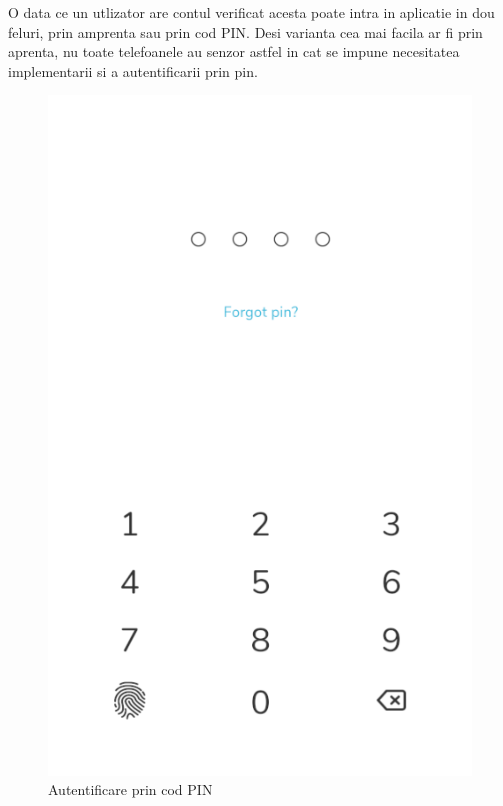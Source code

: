 \documentclass[12pt]{article}
\begin{document}
O data ce un utlizator are contul verificat acesta poate intra in aplicatie
in dou feluri, prin amprenta sau prin cod PIN. Desi varianta cea mai facila ar fi prin
aprenta, nu toate telefoanele au senzor astfel in cat se impune necesitatea implementarii
si a autentificarii prin pin.

\begin{figure}[H]
\centering
\begin{minipage}[b]{0.4\textwidth}
    \includegraphics[width=\textwidth]{pin.png}
    \caption{Autentificare prin cod PIN}
\end{minipage}
\hfill
\begin{minipage}[b]{0.4\textwidth}

\end{minipage}
\end{figure}
\end{document}
